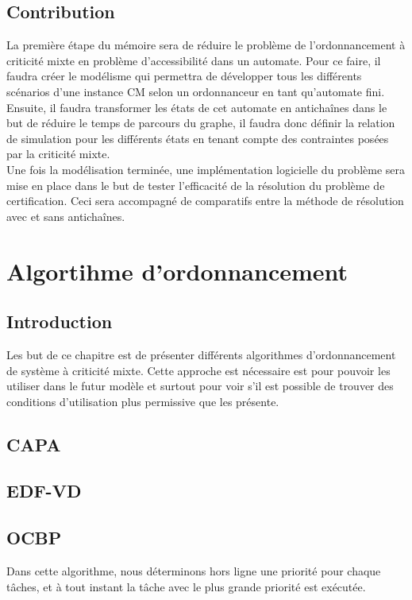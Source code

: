 \documentclass[11pt,a4paper,oneside]{book}
\theoremstyle{break}
\theoremstyle{breakplain}
\begin{document}
\section{Contribution}

La première étape du mémoire sera de réduire le problème de l'ordonnancement à criticité mixte en problème d'accessibilité dans un automate. Pour ce faire, il faudra créer le modélisme qui permettra de développer tous les différents scénarios d'une instance CM selon un ordonnanceur en tant qu'automate fini.\\

Ensuite, il faudra transformer les états de cet automate en antichaînes dans le but de réduire le temps de parcours du graphe, il faudra donc définir la relation de simulation pour les différents états en tenant compte des contraintes posées par la criticité mixte.\\

Une fois la modélisation terminée, une implémentation logicielle du problème sera mise en place dans le but de tester l'efficacité de la résolution du problème de certification. Ceci sera accompagné de comparatifs entre la méthode de résolution avec et sans antichaînes.



\chapter{Algortihme d'ordonnancement}
\section{Introduction}
Les but de ce chapitre est de présenter différents algorithmes d'ordonnancement de système à criticité mixte. Cette approche est nécessaire est pour pouvoir les utiliser dans le futur modèle et surtout pour voir s'il est possible de trouver des conditions d'utilisation plus permissive que les présente.

\section{CAPA}
\section{EDF-VD}
\section{OCBP}
Dans cette algorithme, nous déterminons hors ligne une priorité pour chaque tâches, et à tout instant la tâche avec le plus grande priorité est exécutée.
\end{document}
